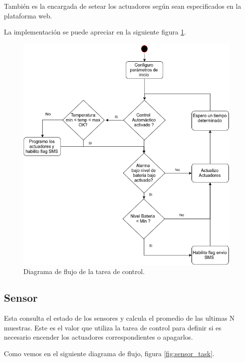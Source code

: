 También es la encargada de setear los actuadores según sean especificados en la plataforma web.

La implementación se puede apreciar en la siguiente figura \ref{fig:control_task}.

\begin{figure}[!hp]
  \centering
  \includegraphics[scale=.5]{./Figures/control_task.png}
  \caption{Diagrama de flujo de la tarea de control.}
  \label{fig:control_task}
\end{figure}


\subsection*{Sensor}
Esta consulta el estado de los sensores y calcula el promedio de las ultimas N muestras. Este es el valor que utiliza la tarea de control para definir si es necesario encender los actuadores correspondientes o apagarlos.

Como vemos en el siguiente diagrama de flujo, figura \ref{fig:sensor_task}.

